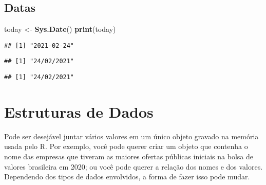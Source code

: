 \documentclass[
]{book}
\newenvironment{Shaded}{\begin{snugshade}}{\end{snugshade}}
\newcommand{\KeywordTok}[1]{\textcolor[rgb]{0.13,0.29,0.53}{\textbf{#1}}}
\newcommand{\NormalTok}[1]{#1}
\newcommand{\StringTok}[1]{\textcolor[rgb]{0.31,0.60,0.02}{#1}}
\begin{document}
\hypertarget{datas}{%
\section{Datas}\label{datas}}

\begin{Shaded}
\begin{Highlighting}[]
\NormalTok{today <-}\StringTok{ }\KeywordTok{Sys.Date}\NormalTok{()}
\KeywordTok{print}\NormalTok{(today)}
\end{Highlighting}
\end{Shaded}

\begin{verbatim}
## [1] "2021-02-24"
\end{verbatim}

\begin{Shaded}
\end{Shaded}

\begin{verbatim}
## [1] "24/02/2021"
\end{verbatim}

\begin{Shaded}
\end{Shaded}

\begin{verbatim}
## [1] "24/02/2021"
\end{verbatim}

\hypertarget{estruturas-de-dados}{%
\chapter{Estruturas de Dados}\label{estruturas-de-dados}}

Pode ser desejável juntar vários valores em um único objeto gravado na memória usada pelo R. Por exemplo, você pode querer criar um objeto que contenha o nome das empresas que tiveram as maiores ofertas públicas iniciais na bolsa de valores brasileira em 2020; ou você pode querer a relação dos nomes e dos valores. Dependendo dos tipos de dados envolvidos, a forma de fazer isso pode mudar.
\end{document}
